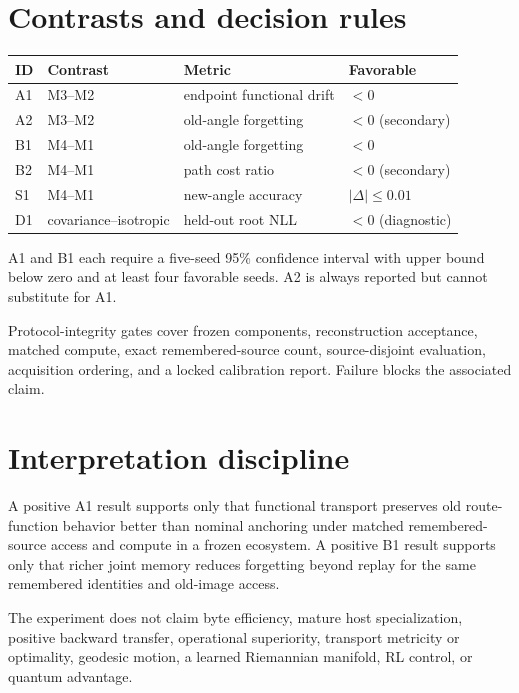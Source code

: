 \documentclass[11pt]{article}
\begin{document}
\section{Contrasts and decision rules}
\begin{center}
\begin{tabular}{llll}
\toprule
ID & Contrast & Metric & Favorable\\
\midrule
A1 & M3--M2 & endpoint functional drift & $<0$\\
A2 & M3--M2 & old-angle forgetting & $<0$ (secondary)\\
B1 & M4--M1 & old-angle forgetting & $<0$\\
B2 & M4--M1 & path cost ratio & $<0$ (secondary)\\
S1 & M4--M1 & new-angle accuracy & $|\Delta|\le0.01$\\
D1 & covariance--isotropic & held-out root NLL & $<0$ (diagnostic)\\
\bottomrule
\end{tabular}
\end{center}
A1 and B1 each require a five-seed 95\% confidence interval with upper bound below zero and at least four favorable seeds. A2 is always reported but cannot substitute for A1.

Protocol-integrity gates cover frozen components, reconstruction acceptance, matched compute, exact remembered-source count, source-disjoint evaluation, acquisition ordering, and a locked calibration report. Failure blocks the associated claim.

\section{Interpretation discipline}
A positive A1 result supports only that functional transport preserves old route-function behavior better than nominal anchoring under matched remembered-source access and compute in a frozen ecosystem. A positive B1 result supports only that richer joint memory reduces forgetting beyond replay for the same remembered identities and old-image access.

The experiment does not claim byte efficiency, mature host specialization, positive backward transfer, operational superiority, transport metricity or optimality, geodesic motion, a learned Riemannian manifold, RL control, or quantum advantage.
\end{document}
